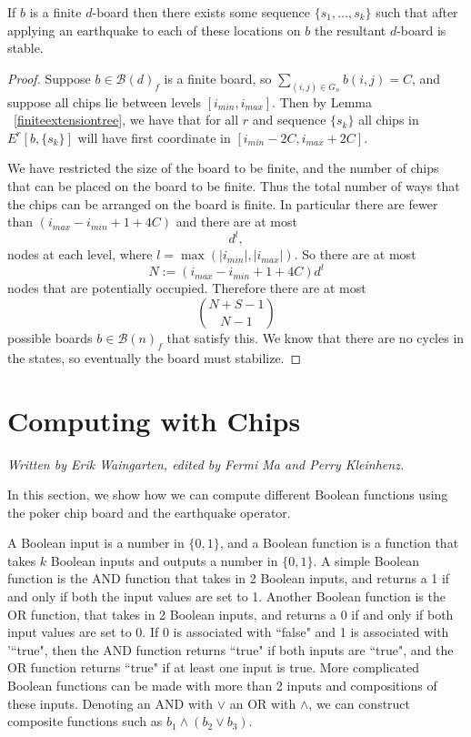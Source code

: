 \documentclass[runningheads,a4paper]{llncs}
\begin{document}
\begin{theorem} If $b$ is a finite $d$-board then there exists some sequence $\{s_1, \ldots, s_k\}$ such that after applying an earthquake to each of these locations on $b$ the resultant $d$-board is stable.
\end{theorem}
\begin{proof}
 Suppose $b \in \mathcal{B}(d)_f$ is a finite board, so $\sum_{(i,j) \in G_n} b(i,j) = C$, and suppose all chips lie between levels  $[i_{min}, i_{max}]$. Then by Lemma ~\ref{finiteextensiontree}, we have that for all $r$ and sequence $\{s_k\}$ all chips in $E^r[b, \{s_k\}]$ will have first coordinate in $ [i_{min} -2C, i_{max} +2C]$.

We have restricted the size of the board to be finite, and the number of chips that can be placed on the board to be finite. 
Thus the total number of ways that the chips can be arranged on the board is finite. 
In particular there are fewer than $(i_{max} - i_{min}+1 + 4 C)$  and there are at most 
\begin{equation}
d^l,
\end{equation}
nodes at each level, where $l= \max(|i_{min}|, |i_{max}|)$. So there are at most 
\begin{equation}
N:=(i_{max} - i_{min}+1 + 4 C)d^l
\end{equation}
nodes that are potentially occupied. Therefore there are at most 
\begin{equation}
\binom{N+S-1}{N-1}
\end{equation}
possible boards $b \in \mathcal{B}(n)_f$ that satisfy this. We know that there are no cycles in the states, so eventually the board must stabilize.
\end{proof}


\section{Computing with Chips}
\label{Computing with Chips}

\emph{Written by Erik Waingarten, edited by Fermi Ma and Perry Kleinhenz.}

In this section, we show how we can compute different Boolean functions using the poker chip board and the earthquake operator.

A Boolean input is a number in $\{0,1\}$, and a Boolean function is a function that takes $k$ Boolean inputs and outputs a number in $\{0,1\}$. A simple Boolean function is the AND function that takes in 2 Boolean inputs, and returns a 1 if and only if both the input values are set to 1. Another Boolean function is the OR function, that takes in 2 Boolean inputs, and returns a 0 if and only if both input values are set to 0. If 0 is associated with ``false" and 1 is associated with '``true", then the AND function returns ``true" if both inputs are ``true", and the OR function returns ``true" if at least one input is true. More complicated Boolean functions can be made with more than 2 inputs and compositions of these inputs. Denoting an AND with $\vee$ an OR with $\wedge$, we can construct composite functions such as $b_1 \wedge (b_2 \vee b_3)$. 
\end{document}
